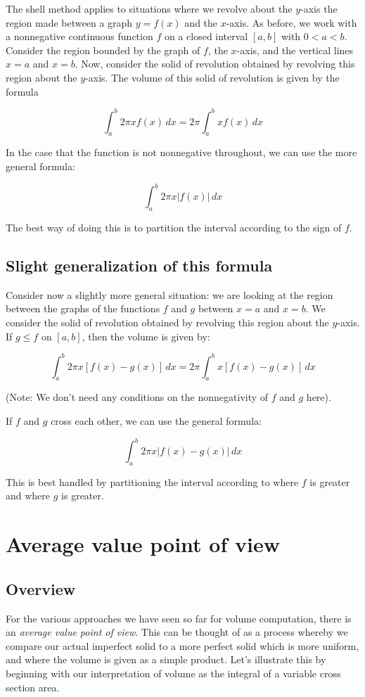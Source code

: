 \documentclass[10pt]{amsart}
\begin{document}
The shell method applies to situations where we revolve about the
$y$-axis the region made between a graph $y = f(x)$ and the
$x$-axis. As before, we work with a nonnegative continuous function
$f$ on a closed interval $[a,b]$ with $0 < a < b$. Consider the region
bounded by the graph of $f$, the $x$-axis, and the vertical lines $x =
a$ and $x = b$. Now, consider the solid of revolution obtained by
revolving this region about the $y$-axis. The volume of this solid of
revolution is given by the formula

$$\int_a^b 2\pi x f(x) \, dx = 2\pi \int_a^b xf(x) \, dx$$

In the case that the function is not nonnegative throughout, we can
use the more general formula:

$$\int_a^b 2\pi x |f(x)| \, dx$$

The best way of doing this is to partition the interval according to
the sign of $f$.
\subsection{Slight generalization of this formula}

Consider now a slightly more general situation: we are looking at the
region between the graphs of the functions $f$ and $g$ between $x = a$
and $x =b$. We consider the solid of revolution obtained by revolving
this region about the $y$-axis. If $g \le f$ on $[a,b]$, then the
volume is given by:

$$\int_a^b 2\pi x[f(x) - g(x)] \, dx = 2\pi \int_a^b x[f(x) - g(x)] \, dx$$

(Note: We don't need any conditions on the nonnegativity of $f$ and
$g$ here).

If $f$ and $g$ cross each other, we can use the general formula:

$$\int_a^b 2\pi x|f(x) - g(x)| \, dx$$

This is best handled by partitioning the interval according to where
$f$ is greater and where $g$ is greater.

\section{Average value point of view}

\subsection{Overview}

For the various approaches we have seen so far for volume computation,
there is an {\em average value point of view}. This can be thought of
as a process whereby we compare our actual imperfect solid to a more
perfect solid which is more uniform, and where the volume is given as
a simple product. Let's illustrate this by beginning with our
interpretation of volume as the integral of a variable cross section
area.
\end{document}
